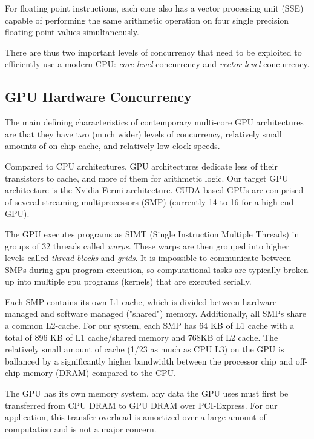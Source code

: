 \documentclass[10pt,twocolumn,letterpaper]{article}
\begin{document}
For floating point instructions, each core also has a vector processing unit
(SSE) capable of performing the same arithmetic operation on four single
precision floating point values simultaneously.  

There are thus two important levels of concurrency that need to be exploited to
efficiently use a modern CPU: {\em core-level} concurrency and {\em vector-level}
concurrency. 

\subsection{GPU Hardware Concurrency}
The main defining characteristics of contemporary multi-core GPU architectures
are that they have two (much wider) levels of concurrency, relatively small amounts of
on-chip cache, and relatively low clock speeds.  

Compared to CPU architectures, GPU architectures dedicate less of their transistors
to cache, and more of them for arithmetic logic. Our target GPU architecture
is the Nvidia Fermi architecture.  CUDA based GPUs are comprised of several 
streaming multiprocessors (SMP) (currently 14 to 16 for a high end GPU).

The GPU executes programs as SIMT (Single Instruction Multiple Threads) in
groups of 32 threads called \emph{warps}.  These warps are then grouped into
higher levels called \emph{thread blocks} and \emph{grids}.  It is impossible
to communicate between SMPs during gpu program execution, so computational tasks
are typically broken up into multiple gpu programs (kernels) that are executed
serially.  

Each SMP contains its own L1-cache, which is divided between hardware managed
and software managed ("shared") memory.  Additionally, all SMPs share a common
L2-cache.  For our system, each SMP has 64 KB of L1 cache with a total of 896
KB of L1 cache/shared memory and 768KB of L2 cache. The relatively small amount
of cache (1/23 as much as CPU L3) on the GPU is ballanced by a significantly
higher bandwidth between the processor chip and off-chip memory (DRAM) compared
to the CPU.  

The GPU has its own memory system, any data the GPU uses must first be
transferred from CPU DRAM to GPU DRAM over PCI-Express.  For our application,
this transfer overhead is amortized over a large amount of computation and is
not a major concern.
\end{document}

